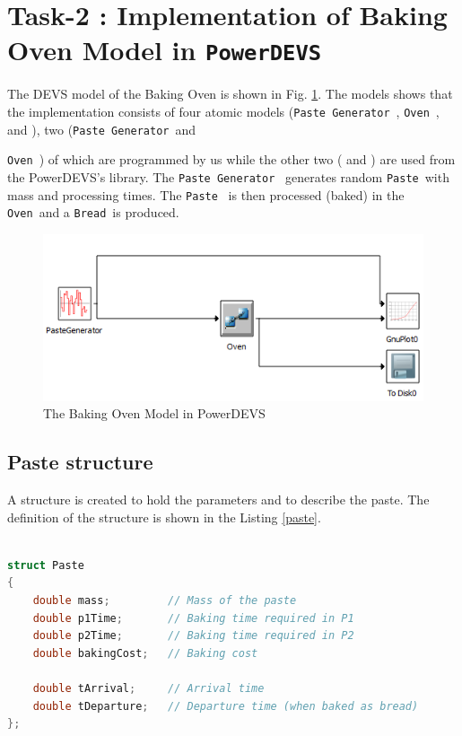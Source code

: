 \documentclass[titlepage]{article}%
\newcommand{\oven}{\texttt{Oven}~}
\newcommand{\pgen}{\texttt{Paste Generator}~}
\newcommand{\paste}{\texttt{Paste}~}
\newcommand{\bread}{\texttt{Bread}~}
\newcommand{\pd}{\texttt{PowerDEVS}~}
\begin{document}
\section{Task-2 : Implementation of Baking Oven Model in \pd}

The DEVS model of the Baking Oven is shown in Fig. \ref{fig:model}. The models shows that the 
implementation consists of four atomic models (\pgen, \oven, 
{} and {}), two (\pgen and 
{\oven) of which are programmed by us while the other two ({} and 
{}) are used from the PowerDEVS's library. The \pgen 
generates random \paste with mass and processing times. The \paste 
is then processed (baked) in the \oven and a \bread is produced. 

\begin{figure}[htbp]
	\centering
		\includegraphics[scale=0.8]{model.PNG}
	\caption{The Baking Oven Model in PowerDEVS}
	\label{fig:model}
\end{figure}

\subsection{Paste structure}

A structure is created to hold the parameters and to describe the paste. The definition of the structure is shown in the Listing \ref{paste}.

\begin{lstlisting}[caption={Paste structure}, language=c++, label={paste}]

struct Paste
{
    double mass;         // Mass of the paste
    double p1Time;       // Baking time required in P1
    double p2Time;       // Baking time required in P2
    double bakingCost;   // Baking cost
	
    double tArrival;     // Arrival time
    double tDeparture;   // Departure time (when baked as bread)
};


\end{lstlisting}}
\end{document}
